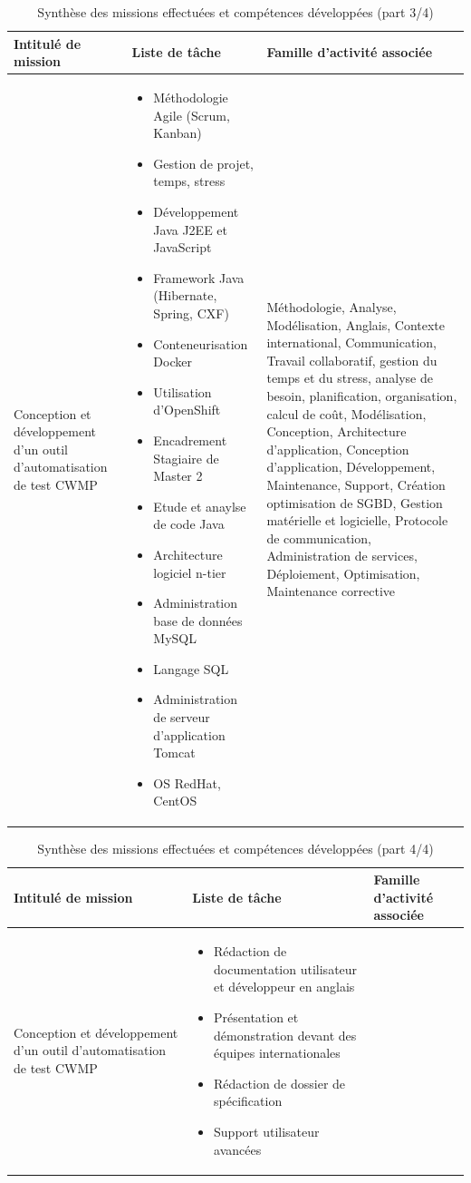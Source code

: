 \documentclass[12pt,a4paper]{report}
\begin{document}
\begin{table}
	\begin{tabularx}{16cm}{|X|X|X|}
		\hline
		Intitulé de mission & Liste de tâche & Famille d'activité associée\tabularnewline
		\hline
		Conception et développement d'un outil d'automatisation de test CWMP
			& 
				\begin{itemize}
				\item Méthodologie Agile (Scrum, Kanban)
				\item Gestion de projet, temps, stress
				\item Développement Java J2EE et JavaScript
				\item Framework Java (Hibernate, Spring, CXF)
				\item Conteneurisation Docker
				\item Utilisation d'OpenShift
				\item Encadrement Stagiaire de Master 2
				\item Etude et anaylse de code Java
				\item Architecture logiciel n-tier				
				\item Administration base de données MySQL
				\item Langage SQL
				\item Administration de serveur d'application Tomcat
				\item OS RedHat, CentOS
				\end{itemize}
			& Méthodologie, Analyse, Modélisation, Anglais, Contexte international, Communication, Travail collaboratif, gestion du temps et du stress, analyse de besoin, planification, organisation, calcul de coût, Modélisation, Conception, Architecture d'application, Conception d'application, Développement, Maintenance, Support, Création optimisation de SGBD, Gestion matérielle et logicielle, Protocole de communication, Administration de services, Déploiement, Optimisation, Maintenance corrective \tabularnewline
		\hline
		\end{tabularx}
	\centering
	\caption{Synthèse des missions effectuées et compétences développées (part 3/4)}
\end{table}

\begin{table}
	\begin{tabularx}{16cm}{|X|X|X|}
		\hline
		Intitulé de mission & Liste de tâche & Famille d'activité associée\tabularnewline
		\hline
		Conception et développement d'un outil d'automatisation de test CWMP
			& 
				\begin{itemize}
				\item Rédaction de documentation utilisateur et développeur en anglais
				\item Présentation et démonstration devant des équipes internationales 
				\item Rédaction de dossier de spécification
				\item Support utilisateur avancées
				\end{itemize}
			& \tabularnewline
		\hline
		\end{tabularx}
	\centering
	\caption{Synthèse des missions effectuées et compétences développées (part 4/4)}
\end{table}
\end{document}
